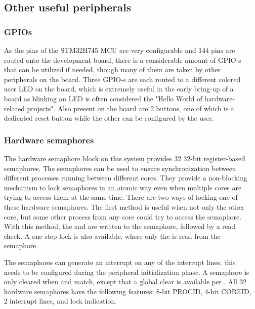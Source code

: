 \subsection{Other useful peripherals}

\subsubsection{GPIOs}

As the pins of the STM32H745 MCU are very configurable and 144 pins are routed onto the development board, there is a considerable amount of GPIO-s that can be utilized if needed, though many of them are taken by other peripherals on the board. Three GPIO-s are each routed to a different colored user LED on the board, which is extremely useful in the early bring-up of a board as blinking an LED is often considered the "Hello World of hardware-related projects". Also present on the board are 2 buttons, one of which is a dedicated reset button while the other can be configured by the user.

\subsubsection{Hardware semaphores}

The hardware semaphore block on this system provides 32 32-bit register-based semaphores. The semaphores can be used to ensure synchronization between different processes running between different cores. They provide a non-blocking mechanism to lock semaphores in an atomic way even when multiple cores are trying to access them at the same time. There are two ways of locking one of these hardware semaphores. The first method is useful when not only the other core, but some other process from any core could try to access the semaphore. With this method, the  and  are written to the semaphore, followed by a read check. A one-step lock is also available, where only the  is read from the semaphore.

The semaphores can generate an interrupt on any of the interrupt lines, this needs to be configured during the peripheral initialization phase. A semaphore is only cleared when  and  match, except that a global clear is available per . All 32 hardware semaphores have the following features: 8-bit PROCID, 4-bit COREID, 2 interrupt lines, and lock indication.

